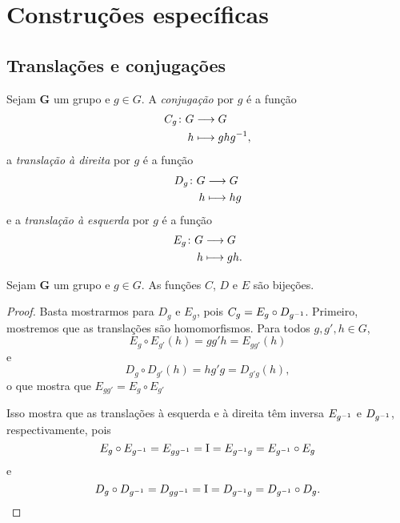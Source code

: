 \cleardoublepage
\section{Construções específicas}

\subsection{Translações e conjugações}

\begin{definition}
Sejam $\bm G$ um grupo e $g \in G$. A \emph{conjugação} por $g$ é a função
	\begin{align*}
	{C_g}\colon {G} &\longrightarrow {G} \\{h} &\longmapsto ghg^{-1},
	\end{align*}
a \emph{translação à direita} por $g$ é a função
	\begin{align*}
	{D_g}\colon {G} &\longrightarrow {G} \\{h} &\longmapsto hg
	\end{align*}
e a \emph{translação à esquerda} por $g$ é a função
	\begin{align*}
	{E_g}\colon {G} &\longrightarrow {G} \\{h} &\longmapsto gh.
	\end{align*}
\end{definition}

\begin{proposition}
Sejam $\bm G$ um grupo e $g \in G$. As funções $C$, $D$ e $E$ são bijeções.
\end{proposition}
\begin{proof}
Basta mostrarmos para $D_g$ e $E_g$, pois $C_g = E_{g} \circ D_{g^{-1}}$. Primeiro, mostremos que as translações são homomorfismos. Para todos $g,g',h \in G$,
	\begin{equation*}
		E_{g} \circ E_{g'}(h) = gg'h = E_{gg'}(h)
	\end{equation*}
e
	\begin{equation*}
		D_{g} \circ D_{g'}(h) = hg'g = D_{g'g}(h),
	\end{equation*}
o que mostra que $E_{gg'} = E_g \circ E_{g'}$

Isso mostra que as translações à esquerda e à direita têm inversa $E_{g^{-1}}$ e $D_{g^{-1}}$, respectivamente, pois
	\begin{equation*}
		E_{g} \circ E_{g^{-1}} = E_{gg^{-1}} = \mathrm{I} = E_{g^{-1} g} = E_{g^{-1}} \circ E_{g}
	\end{equation*}
e
	\begin{equation*}
		D_{g} \circ D_{g^{-1}} = D_{gg^{-1}} = \mathrm{I} = D_{g^{-1} g} = D_{g^{-1}} \circ D_{g}.
	\end{equation*}
\end{proof}

